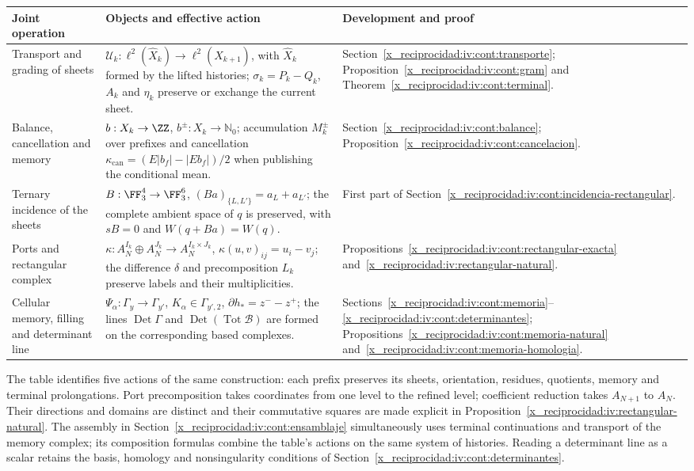 \begin{center}
\small
\begin{tabular}{@{}p{.21\linewidth}p{.48\linewidth}p{.23\linewidth}@{}}
\toprule
Joint operation & Objects and effective action & Development and proof\\
\midrule
Transport and grading of sheets
& \(\mathcal U_k:\ell^2(\widehat X_k)\to
\ell^2(\widehat X_{k+1})\), with \(\widehat X_k\) formed by
the lifted histories; \(\sigma_k=P_k-Q_k\), \(A_k\) and
\(\eta_k\) preserve or exchange the current sheet.
& Section~\ref{x_reciprocidad:iv:cont:transporte}; Proposition~\ref{x_reciprocidad:iv:cont:gram}
and Theorem~\ref{x_reciprocidad:iv:cont:terminal}.\\[5pt]
Balance, cancellation and memory
& \(b:X_k\to\ZZ\), \(b^\pm:X_k\to\mathbb N_0\);
accumulation \(M_k^\pm\) over prefixes and cancellation
\(\kappa_{\mathrm{can}}=(E|b_f|-|Eb_f|)/2\) when publishing
the conditional mean.
& Section~\ref{x_reciprocidad:iv:cont:balance};
Proposition~\ref{x_reciprocidad:iv:cont:cancelacion}.\\[5pt]
Ternary incidence of the sheets
& \(B:\FF_3^4\to\FF_3^6\),
\((Ba)_{\{L,L'\}}=a_L+a_{L'}\); the complete ambient space
of \(q\) is preserved, with \(sB=0\) and \(W(q+Ba)=W(q)\).
& First part of
Section~\ref{x_reciprocidad:iv:cont:incidencia-rectangular}.\\[5pt]
Ports and rectangular complex
& \(\kappa:A_N^{I_k}\oplus A_N^{J_k}\to
A_N^{I_k\times J_k}\), \(\kappa(u,v)_{ij}=u_i-v_j\);
the difference \(\delta\) and precomposition \(L_k\)
preserve labels and their multiplicities.
& Propositions~\ref{x_reciprocidad:iv:cont:rectangular-exacta}
and~\ref{x_reciprocidad:iv:rectangular-natural}.\\[5pt]
Cellular memory, filling and determinant line
& \(\Psi_\alpha:\Gamma_y\to\Gamma_{y'}\),
\(K_\alpha\in\Gamma_{y',2}\),
\(\partial h_*=z^--z^+\); the lines
\(\operatorname{Det}\Gamma\) and
\(\operatorname{Det}(\operatorname{Tot}\mathcal B)\)
are formed on the corresponding based complexes.
& Sections~\ref{x_reciprocidad:iv:cont:memoria}--\ref{x_reciprocidad:iv:cont:determinantes};
Propositions~\ref{x_reciprocidad:iv:cont:memoria-natural}
and~\ref{x_reciprocidad:iv:cont:memoria-homologia}.\\
\bottomrule
\end{tabular}
\end{center}

The table identifies five actions of the same construction: each
prefix preserves its sheets, orientation, residues, quotients, memory
and terminal prolongations. Port precomposition takes
coordinates from one level to the refined level; coefficient reduction
takes \(A_{N+1}\) to \(A_N\). Their directions and domains are
distinct and their commutative squares are made explicit in
Proposition~\ref{x_reciprocidad:iv:rectangular-natural}. The assembly in
Section~\ref{x_reciprocidad:iv:cont:ensamblaje} simultaneously uses terminal
continuations and transport of the memory complex;
its composition formulas combine the table's actions on the
same system of histories. Reading a determinant line
as a scalar retains the basis, homology and
nonsingularity conditions of Section~\ref{x_reciprocidad:iv:cont:determinantes}.


